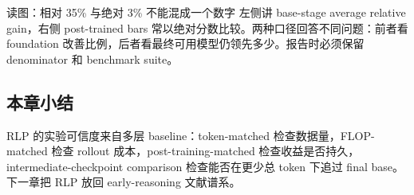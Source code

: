 
\begin{knowledgebox}{读图：相对 35\% 与绝对 3\% 不能混成一个数字}
左侧讲 base-stage average relative gain，右侧 post-trained bars 常以绝对分数比较。两种口径回答不同问题：前者看 foundation 改善比例，后者看最终可用模型仍领先多少。报告时必须保留 denominator 和 benchmark suite。
\end{knowledgebox}

\subsection{本章小结}

RLP 的实验可信度来自多层 baseline：token-matched 检查数据量，FLOP-matched 检查 rollout 成本，post-training-matched 检查收益是否持久，intermediate-checkpoint comparison 检查能否在更少总 token 下追过 final base。下一章把 RLP 放回 early-reasoning 文献谱系。

